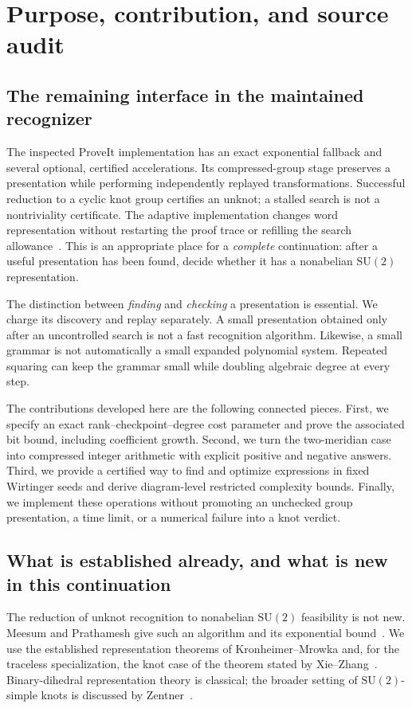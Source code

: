 \documentclass[11pt]{article}
\theoremstyle{definition}
\theoremstyle{remark}
\newcommand{\SU}{\mathrm{SU}(2)}
\begin{document}
\section{Purpose, contribution, and source audit}
\label{sec:purpose}

\subsection{The remaining interface in the maintained recognizer}
The inspected ProveIt implementation has an exact exponential fallback and several optional, certified accelerations. Its compressed-group stage preserves a presentation while performing independently replayed transformations. Successful reduction to a cyclic knot group certifies an unknot; a stalled search is not a nontriviality certificate. The adaptive implementation changes word representation without restarting the proof trace or refilling the search allowance~\cite{repo-adaptive,repo-words}. This is an appropriate place for a \emph{complete} continuation: after a useful presentation has been found, decide whether it has a nonabelian $\SU$ representation.

The distinction between \emph{finding} and \emph{checking} a presentation is essential. We charge its discovery and replay separately. A small presentation obtained only after an uncontrolled search is not a fast recognition algorithm. Likewise, a small grammar is not automatically a small expanded polynomial system. Repeated squaring can keep the grammar small while doubling algebraic degree at every step.

The contributions developed here are the following connected pieces. First, we specify an exact rank--checkpoint--degree cost parameter and prove the associated bit bound, including coefficient growth. Second, we turn the two-meridian case into compressed integer arithmetic with explicit positive and negative answers. Third, we provide a certified way to find and optimize expressions in fixed Wirtinger seeds and derive diagram-level restricted complexity bounds. Finally, we implement these operations without promoting an unchecked group presentation, a time limit, or a numerical failure into a knot verdict.

\subsection{What is established already, and what is new in this continuation}
The reduction of unknot recognition to nonabelian $\SU$ feasibility is not new. Meesum and Prathamesh give such an algorithm and its exponential bound~\cite{meesum}. We use the established representation theorems of Kronheimer--Mrowka and, for the traceless specialization, the knot case of the theorem stated by Xie--Zhang~\cite{km,xz}. Binary-dihedral representation theory is classical; the broader setting of $\SU$-simple knots is discussed by Zentner~\cite{zentner}.
\end{document}
